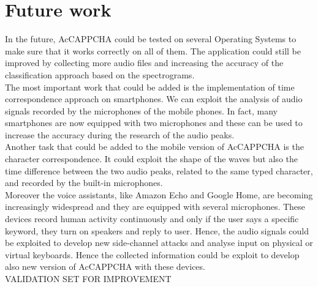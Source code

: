 \chapter{Future work}\label{chapter:Future}
In the future, AcCAPPCHA could be tested on several Operating Systems to make sure that it works correctly on all of them. The application could still be improved by collecting more audio files and increasing the accuracy of the classification approach based on the spectrograms.\\
The most important work that could be added is the implementation of time correspondence approach on smartphones. We can exploit the analysis of audio signals recorded by the microphones of the mobile phones. In fact, many smartphones are now equipped with two microphones and these can be used to increase the accuracy during the research of the audio peaks.\\
Another task that could be added to the mobile version of AcCAPPCHA is the character correspondence. It could exploit the shape of the waves but also the time difference between the two audio peaks, related to the same typed character, and  recorded by the built-in microphones\cite{smartphone_acoustic}. \\
Moreover the voice assistants, like Amazon Echo and Google Home, are becoming increasingly widespread and they are equipped with several microphones. These devices record human activity continuously and only if the user says a specific keyword, they turn on speakers and reply to user. Hence, the audio signals could be exploited to develop new side-channel attacks and analyse input on physical or virtual keyboards\cite{voice_assistant}. Hence the collected information could be exploit to develop also new version of AcCAPPCHA with these devices.\\
VALIDATION SET FOR IMPROVEMENT